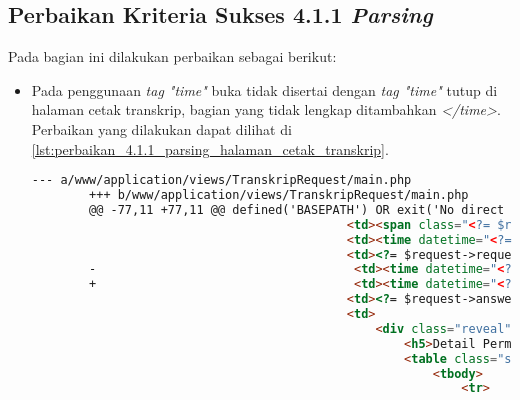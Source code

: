 \subsection{Perbaikan Kriteria Sukses 4.1.1 \textit{Parsing}}
\label{subsec:perbaikan_kriteria_sukses_4.1.1}
Pada bagian ini dilakukan perbaikan sebagai berikut:

\begin{itemize}
    \item Pada penggunaan \textit{tag "time"} buka tidak disertai dengan \textit{tag "time"} tutup di halaman cetak transkrip, bagian yang tidak lengkap ditambahkan \textit{</time>}. Perbaikan yang dilakukan dapat dilihat di \ref{lst:perbaikan_4.1.1_parsing_halaman_cetak_transkrip}.
    \begin{lstlisting}[frame=single, label={lst:perbaikan_4.1.1_parsing_halaman_cetak_transkrip}, language=HTML, caption=Perbaikan Kriteria Sukses 4.1.1 - Kesalahan Elemen pada Halaman Cetak Transkrip]
        --- a/www/application/views/TranskripRequest/main.php
        +++ b/www/application/views/TranskripRequest/main.php
        @@ -77,11 +77,11 @@ defined('BASEPATH') OR exit('No direct script access allowed');
                                            <td><span class="<?= $request->labelClass ?> label"><?= $request->status ?></span></td>
                                            <td><time datetime="<?= $request->requestDateTime ?>"><?= $request->requestDateString ?></time></td>
                                            <td><?= $request->requestType ?></td>
        -                                    <td><time datetime="<?= $request->answeredDateTime ?>"><?= $request->answeredDateString ?></td>
        +                                    <td><time datetime="<?= $request->answeredDateTime ?>"><?= $request->answeredDateString ?></time></td>
                                            <td><?= $request->answeredMessage ?></td>
                                            <td>
                                                <div class="reveal" id="detail<?= $request->id ?>" data-reveal>
                                                    <h5>Detail Permohonan #<?= $request->id ?></h5>
                                                    <table class="stack">
                                                        <tbody>
                                                            <tr>
    \end{lstlisting} 


\end{itemize}
